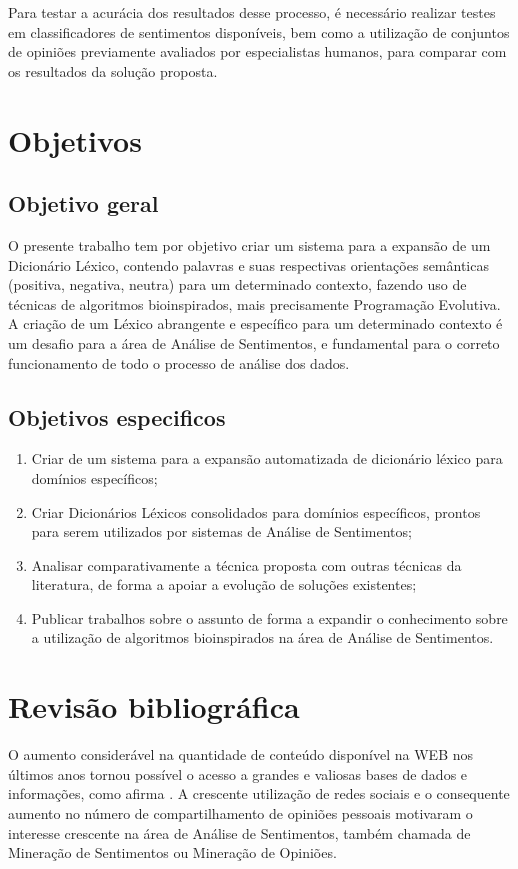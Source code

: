 \documentclass[a4paper,11pt]{article}
\begin{document}
Para testar a acurácia dos resultados desse processo, é necessário realizar testes em classificadores de sentimentos disponíveis, bem como a utilização de conjuntos de opiniões previamente avaliados por especialistas humanos, para comparar com os resultados da solução proposta.

\section{Objetivos}
\label{sec:obj}
\subsection{Objetivo geral}
O presente trabalho tem por objetivo criar um sistema para a expansão de um Dicionário Léxico, contendo palavras e suas respectivas orientações semânticas (positiva, negativa, neutra) para um determinado contexto, fazendo uso de técnicas de algoritmos bioinspirados, mais precisamente Programação Evolutiva. A criação de um Léxico abrangente e específico para um determinado contexto é um desafio para a área de Análise de Sentimentos, e fundamental para o correto funcionamento de todo o processo de análise dos dados.

\subsection{Objetivos especificos}

\begin{enumerate}
\item Criar de um sistema para a expansão automatizada de dicionário léxico para domínios específicos;
\item Criar Dicionários Léxicos consolidados para domínios específicos, prontos para serem utilizados por sistemas de Análise de Sentimentos;
\item Analisar comparativamente a técnica proposta com outras técnicas da literatura, de forma a apoiar a evolução de soluções existentes;
\item Publicar trabalhos sobre o assunto de forma a expandir o conhecimento sobre a utilização de algoritmos bioinspirados na área de Análise de Sentimentos.

\end{enumerate}

\section{Revisão bibliográfica}
\label{sec:bibl}
O aumento considerável na quantidade de conteúdo disponível na WEB nos últimos anos tornou possível o acesso a grandes e valiosas bases de dados e informações, como afirma \cite{kdir16}. A crescente utilização de redes sociais e o consequente aumento no número de compartilhamento de opiniões pessoais motivaram o interesse crescente na área de Análise de Sentimentos, também chamada de Mineração de Sentimentos ou Mineração de Opiniões. 
\end{document}
